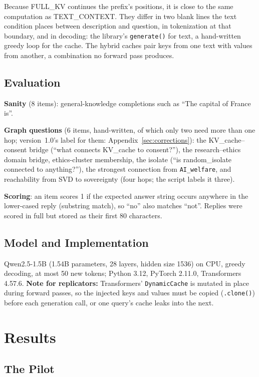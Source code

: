 \documentclass[11pt,a4paper]{article}
\begin{document}
Because FULL\_KV continues the prefix's positions, it is close to the same computation as TEXT\_CONTEXT. They differ in two blank lines the text condition places between description and question, in tokenization at that boundary, and in decoding: the library's \texttt{generate()} for text, a hand-written greedy loop for the cache. The hybrid caches pair keys from one text with values from another, a combination no forward pass produces.

\subsection{Evaluation}

\textbf{Sanity} (8 items): general-knowledge completions such as ``The capital of France is''.

\textbf{Graph questions} (6 items, hand-written, of which only two need more than one hop; version~1.0's label for them: Appendix~\ref{sec:corrections}): the KV\_cache--consent bridge (``what connects KV\_cache to consent?''), the research--ethics domain bridge, ethics-cluster membership, the isolate (``is random\_isolate connected to anything?''), the strongest connection from \texttt{AI\_welfare}, and reachability from SVD to sovereignty (four hops; the script labels it three).

\textbf{Scoring}: an item scores 1 if the expected answer string occurs anywhere in the lower-cased reply (substring match), so ``no'' also matches ``not''. Replies were scored in full but stored as their first 80 characters.

\subsection{Model and Implementation}

Qwen2.5-1.5B (1.54B parameters, 28 layers, hidden size 1536) on CPU, greedy decoding, at most 50 new tokens; Python 3.12, PyTorch 2.11.0, Transformers 4.57.6. \textbf{Note for replicators:} Transformers' \texttt{DynamicCache} is mutated in place during forward passes, so the injected keys and values must be copied (\texttt{.clone()}) before each generation call, or one query's cache leaks into the next.

\section{Results}

\subsection{The Pilot}
\end{document}
